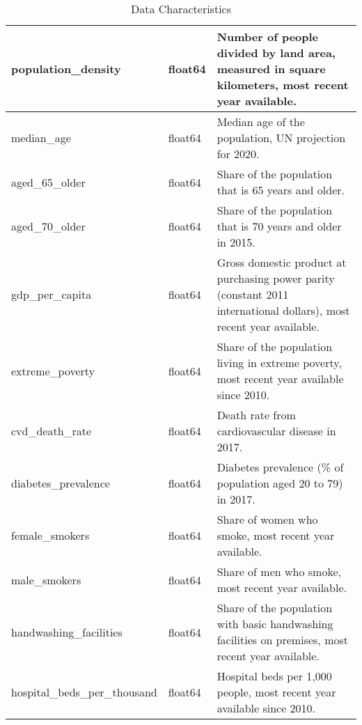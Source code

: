 \documentclass[10pt]{article}
\begin{document}
\begin{table}[htbp]
\begin{tabular}{|l|l|p{8cm}|}
        \hline
        population\_density & float64 & Number of people divided by land area, measured in square kilometers, most recent year available. \\
        \hline
        median\_age & float64 & Median age of the population, UN projection for 2020. \\
        \hline
        aged\_65\_older & float64 & Share of the population that is 65 years and older. \\
        \hline
        aged\_70\_older & float64 & Share of the population that is 70 years and older in 2015. \\
        \hline
        gdp\_per\_capita & float64 & Gross domestic product at purchasing power parity (constant 2011 international dollars), most recent year available. \\
        \hline
        extreme\_poverty & float64 & Share of the population living in extreme poverty, most recent year available since 2010. \\
        \hline
        cvd\_death\_rate & float64 & Death rate from cardiovascular disease in 2017. \\
        \hline
        diabetes\_prevalence & float64 & Diabetes prevalence (\% of population aged 20 to 79) in 2017. \\
        \hline
        female\_smokers & float64 & Share of women who smoke, most recent year available. \\
        \hline
        male\_smokers & float64 & Share of men who smoke, most recent year available. \\
        \hline
        handwashing\_facilities & float64 & Share of the population with basic handwashing facilities on premises, most recent year available. \\
        \hline
        hospital\_beds\_per\_thousand & float64 & Hospital beds per 1,000 people, most recent year available since 2010. \\
        \hline
    \end{tabular}
	\caption{Data Characteristics}
	\label{tab:data_chars}
\end{table}
\end{document}
